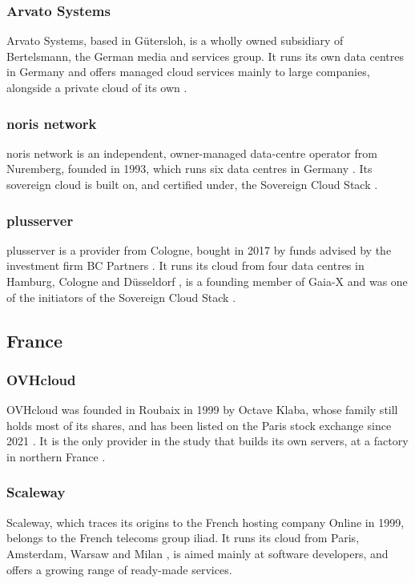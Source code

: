 \subsubsection*{Arvato Systems}
Arvato Systems, based in G\"utersloh, is a wholly owned subsidiary of
Bertelsmann, the German media and services group. It runs its own data centres in
Germany and offers managed cloud services mainly to large companies, alongside a
private cloud of its own \cite{Arvato_About,Arvato_DataCenter}.

\subsubsection*{noris network}
noris network is an independent, owner-managed data-centre operator from
Nuremberg, founded in 1993, which runs six data centres in Germany
\cite{NorisNetwork_About}. Its sovereign cloud is built on, and certified under,
the Sovereign Cloud Stack \cite{SCS_noris}.

\subsubsection*{plusserver}
plusserver is a provider from Cologne, bought in 2017 by funds advised by the
investment firm BC Partners \cite{PlusServer_About,BCPartners_Plusserver_2017}. It
runs its cloud from four data centres in Hamburg, Cologne and D\"usseldorf
\cite{Plusserver_DataCenters}, is a founding member of Gaia-X and was one of the
initiators of the Sovereign Cloud Stack \cite{Plusserver_Associations}.

\subsection{France}

\subsubsection*{OVHcloud}
OVHcloud was founded in Roubaix in 1999 by Octave Klaba, whose family still holds
most of its shares, and has been listed on the Paris stock exchange since 2021
\cite{OVHcloud_IPO,OVHcloud_Shareholders}. It is the
only provider in the study that builds its own servers, at a factory in northern
France \cite{NextInk_OVHCroix_2023}.

\subsubsection*{Scaleway}
Scaleway, which traces its origins to the French hosting company Online in 1999,
belongs to the French telecoms group iliad. It runs its cloud from Paris,
Amsterdam, Warsaw and Milan \cite{Scaleway_About}, is aimed mainly at software
developers, and offers a growing range of ready-made services.

